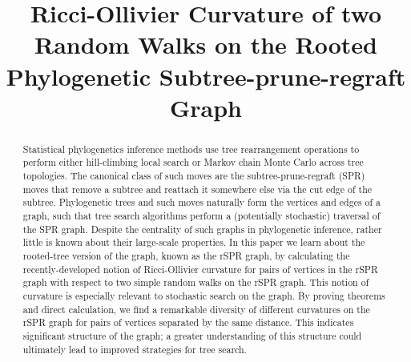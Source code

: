 \documentclass[11pt,onecolumn,conference]{IEEEtran}
\begin{document}
\title{Ricci-Ollivier Curvature of two Random Walks on the Rooted Phylogenetic Subtree-prune-regraft Graph}

\author{
	\and
}

\maketitle
\IEEEpeerreviewmaketitle

\begin{abstract}
Statistical phylogenetics inference methods use tree rearrangement operations to perform either hill-climbing local search or Markov chain Monte Carlo across tree topologies.
The canonical class of such moves are the subtree-prune-regraft (SPR) moves that remove a subtree and reattach it somewhere else via the cut edge of the subtree.
Phylogenetic trees and such moves naturally form the vertices and edges of a graph, such that tree search algorithms perform a (potentially stochastic) traversal of the SPR graph.
Despite the centrality of such graphs in phylogenetic inference, rather little is known about their large-scale properties.
In this paper we learn about the rooted-tree version of the graph, known as the rSPR graph, by calculating the recently-developed notion of Ricci-Ollivier curvature for pairs of vertices in the rSPR graph with respect to two simple random walks on the rSPR graph.
This notion of curvature is especially relevant to stochastic search on the graph.
By proving theorems and direct calculation, we find a remarkable diversity of different curvatures on the rSPR graph for pairs of vertices separated by the same distance.
This indicates significant structure of the graph; a greater understanding of this structure could ultimately lead to improved strategies for tree search.
\end{abstract}

\pagebreak
\end{document}
